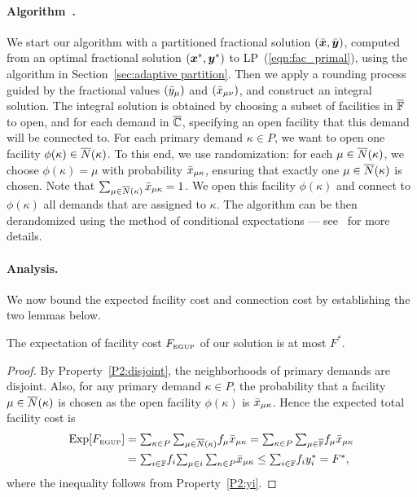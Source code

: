 \documentclass[11pt]{article}
\begin{document}
\paragraph{Algorithm~{\EGUP.}}
We start our algorithm with a partitioned fractional
solution $(\bar{\boldsymbol{x}},\bar{\boldsymbol{y}})$, computed from an optimal
fractional solution $(\boldsymbol{x}^\ast, \boldsymbol{y}^\ast)$ to
LP~(\ref{eqn:fac_primal}), using the algorithm in
Section~\ref{sec:adaptive partition}. Then we apply a
rounding process guided by the fractional values
$({\bar y}_{\mu})$ and $({\bar x}_{\mu\nu})$, and construct an
integral solution. The integral solution is obtained by
choosing a subset of facilities in $\overline{\mathbb{F}}$ to open,
and for each demand in $\overline{\mathbb{C}}$, specifying an open
facility that this demand will be connected to.  For each
primary demand $\kappa\in P$, we want to open one facility
$\phi(\kappa) \in {\overline{N}}(\kappa)$. To this end, we use
randomization: for each $\mu\in{\overline{N}}(\kappa)$, we choose
$\phi(\kappa) = \mu$ with probability ${\bar x}_{\mu\kappa}$,
ensuring that exactly one $\mu \in {\overline{N}}(\kappa)$ is
chosen. Note that
$\sum_{\mu\in{\overline{N}}(\kappa)}{\bar x}_{\mu\kappa}=1$.  We open
this facility $\phi(\kappa)$ and connect to $\phi(\kappa)$
all demands that are assigned to $\kappa$.  The algorithm
can be then derandomized using the method of conditional
expectations --- see~\cite{ChudakS04} for more details.


\paragraph{Analysis.}
We now bound the expected facility cost and connection cost
by establishing the two lemmas below.


\begin{lemma}\label{lemma:3fac}
The expectation of facility cost $F_{\mbox{\tiny\rm EGUP}}$ of our solution is
  at most $F^\ast$.
\end{lemma}

\begin{proof}
By Property~\ref{P2:disjoint}, the neighborhoods of primary demands are disjoint. Also,
  for any primary demand $\kappa\in P$, the probability that
  a facility $\mu\in{\overline{N}}(\kappa)$ is chosen as the open
  facility $\phi(\kappa)$ is ${\bar x}_{\mu\kappa}$. Hence the
  expected total facility cost is
%
\begin{align*}
    \mbox{\rm Exp}[F_{\mbox{\tiny\rm EGUP}}]
	&= \textstyle{\sum_{\kappa\in P}\sum_{\mu\in{\overline{N}}(\kappa)}} f_{\mu} {\bar x}_{\mu\kappa}
	= \textstyle{\sum_{\kappa\in P}\sum_{\mu\in\overline{\mathbb{F}}}} f_{\mu} {\bar x}_{\mu\kappa} 
	\\
	&= \textstyle{\sum_{i\in\mathbb{F}}} f_i \textstyle{\sum_{\mu\in i}\sum_{\kappa\in P}} {\bar x}_{\mu\kappa} 
	\leq \textstyle{\sum_{i\in\mathbb{F}}} f_i y_i^\ast 
	= F^\ast,
\end{align*}
%
where the inequality follows from Property~\ref{P2:yi}.
\end{proof}
\end{document}
